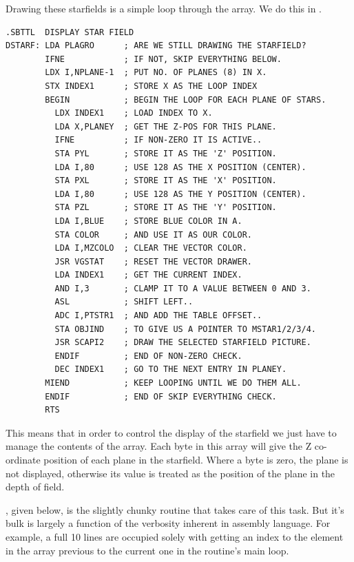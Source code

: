 Drawing these starfields is a simple loop through the  array. We do
this in .

\begin{lstlisting}
.SBTTL  DISPLAY STAR FIELD
DSTARF: LDA PLAGRO      ; ARE WE STILL DRAWING THE STARFIELD?
        IFNE            ; IF NOT, SKIP EVERYTHING BELOW.
        LDX I,NPLANE-1  ; PUT NO. OF PLANES (8) IN X.
        STX INDEX1      ; STORE X AS THE LOOP INDEX
        BEGIN           ; BEGIN THE LOOP FOR EACH PLANE OF STARS.
          LDX INDEX1    ; LOAD INDEX TO X.
          LDA X,PLANEY  ; GET THE Z-POS FOR THIS PLANE.
          IFNE          ; IF NON-ZERO IT IS ACTIVE..
          STA PYL       ; STORE IT AS THE 'Z' POSITION.
          LDA I,80      ; USE 128 AS THE X POSITION (CENTER).
          STA PXL       ; STORE IT AS THE 'X' POSITION.
          LDA I,80      ; USE 128 AS THE Y POSITION (CENTER).
          STA PZL       ; STORE IT AS THE 'Y' POSITION.
          LDA I,BLUE    ; STORE BLUE COLOR IN A.
          STA COLOR     ; AND USE IT AS OUR COLOR.
          LDA I,MZCOLO  ; CLEAR THE VECTOR COLOR. 
          JSR VGSTAT    ; RESET THE VECTOR DRAWER.
          LDA INDEX1    ; GET THE CURRENT INDEX.
          AND I,3       ; CLAMP IT TO A VALUE BETWEEN 0 AND 3.
          ASL           ; SHIFT LEFT..
          ADC I,PTSTR1  ; AND ADD THE TABLE OFFSET..
          STA OBJIND    ; TO GIVE US A POINTER TO MSTAR1/2/3/4.
          JSR SCAPI2    ; DRAW THE SELECTED STARFIELD PICTURE.
          ENDIF         ; END OF NON-ZERO CHECK.
          DEC INDEX1    ; GO TO THE NEXT ENTRY IN PLANEY.
        MIEND           ; KEEP LOOPING UNTIL WE DO THEM ALL.
        ENDIF           ; END OF SKIP EVERYTHING CHECK.
        RTS
\end{lstlisting}

This means that in order to control the display of the starfield we just
have to manage the contents of the  array. Each byte in this
array will give the Z co-ordinate position of each plane in the starfield. Where a byte
is zero, the plane is not displayed, otherwise its value is treated as the position
of the plane in the depth of field.

, given below, is the slightly chunky routine that takes care of this task.
But it's bulk is largely a function of the verbosity inherent in assembly language. For example,
a full 10 lines are occupied solely with getting an index to the element in the array previous
to the current one in the routine's main loop. 

